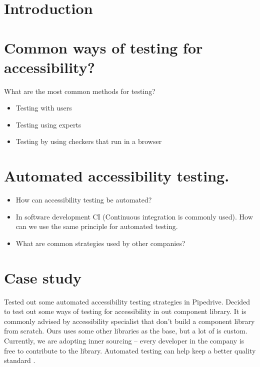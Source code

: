 \documentclass{master_thesis}
\begin{document}

\section{Introduction}


\section{Common ways of testing for accessibility?}
What are the most common methods for testing? \\
\begin{itemize}
	\item Testing with users
	\item Testing using experts
	\item Testing by using checkers that run in a browser
\end{itemize}

\section{Automated accessibility testing.}

\begin{itemize}
	\item How can accessibility testing be automated?
	\item In software development CI (Continuous integration is commonly used). How can we use the same principle for automated testing.
	\item What are common strategies used by other companies?
\end{itemize}

\section{Case study}

Tested out some automated accessibility testing strategies in Pipedrive.
Decided to test out some ways of testing for accessibility in out component library. It is commonly advised by accessibility specialist that don't build a component library from scratch. Ours uses some other libraries as the base, but a lot of is custom. Currently, we are adopting inner sourcing – every developer in the company is free to contribute to the library. Automated testing can help keep a better quality standard \citep{Sane2021}.
\citep{}
\end{document}
